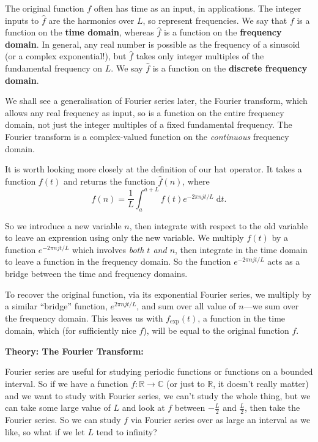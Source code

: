 \documentclass{article}
\newcommand{\diff}{\;\mathrm{d}}
\begin{document}
The original function $f$ often has time as an input, in applications. The integer inputs to $\hat{f}$ are the harmonics over $L$, so represent frequencies. We say that $f$ is a function on the \textbf{time domain}, whereas $\hat{f}$ is a function on the \textbf{frequency domain}. In general, any real number is possible as the frequency of a sinusoid (or a complex exponential!), but $\hat{f}$ takes only integer multiples of the fundamental frequency on $L$. We say $\hat{f}$ is a function on the \textbf{discrete frequency domain}.

We shall see a generalisation of Fourier series later, the Fourier transform, which allows any real frequency as input, so is a function on the entire frequency domain, not just the integer multiples of a fixed fundamental frequency. The Fourier transform is a complex-valued function on the \textit{continuous} frequency domain.

It is worth looking more closely at the definition of our hat operator. It takes a function $f(t)$ and returns the function $\hat{f}(n)$, where
\[\hat{f}(n)=\frac{1}{L}\int_a^{a+L}\!\! f(t)e^{-2\pi njt/L}\diff t.\]

So we introduce a new variable $n$, then integrate with respect to the old variable to leave an expression using only the new variable. We multiply $f(t)$ by a function $e^{-2\pi njt/L}$ which involves \textit{both $t$ and $n$}, then integrate in the time domain to leave a function in the frequency domain. So the function $e^{-2\pi njt/L}$ acts as a bridge between the time and frequency domains.

To recover the original function, via its exponential Fourier series, we multiply by a similar ``bridge'' function, $e^{2\pi njt/L}$, and sum over all value of $n$---we sum over the frequency domain. This leaves us with $f_\mathrm{exp}(t)$, a function in the time domain, which (for sufficiently nice $f$), will be equal to the original function $f$.


\clearpage



\textbf{Theory: The Fourier Transform:}\bigskip


Fourier series are useful for studying periodic functions or functions on a bounded interval. So if we have a function $f:\mathbb{R}\to \mathbb{C}$ (or just to $\mathbb{R}$, it doesn't really matter) and we want to study with Fourier series, we can't study the whole thing, but we can take some large value of $L$ and look at $f$ between $-\frac{L}{2}$ and $\frac{L}{2}$, then take the Fourier series. So we can study $f$ via Fourier series over as large an interval as we like, so what if we let $L$ tend to infinity?
\end{document}
